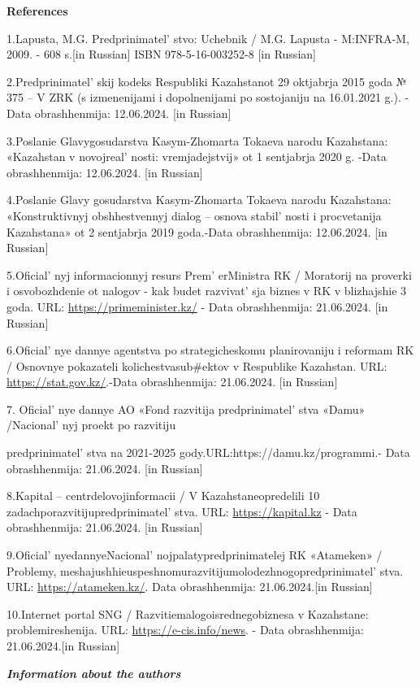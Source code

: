 {\bfseries References}

1.Lapusta, M.G. Predprinimatel' stvo: Uchebnik / M.G.
Lapusta - M:INFRA-M, 2009. - 608 s.{[}in Russian{]} ISBN
978-5-16-003252-8 {[}in Russian{]}

2.Predprinimatel' skij kodeks Respubliki Kazahstanot 29
oktjabrja 2015 goda № 375 -- V ZRK (s izmenenijami i dopolnenijami po
sostojaniju na 16.01.2021 g.). -Data obrashhenmija: 12.06.2024. {[}in
Russian{]}

3.Poslanie Glavygosudarstva Kasym-Zhomarta Tokaeva narodu Kazahstana:
«Kazahstan v novojreal' nosti: vremjadejstvij» ot 1
sentjabrja 2020 g. -Data obrashhenmija: 12.06.2024. {[}in Russian{]}

4.Poslanie Glavy gosudarstva Kasym-Zhomarta Tokaeva narodu Kazahstana:
«Konstruktivnyj obshhestvennyj dialog -- osnova
stabil' nosti i procvetanija Kazahstana» ot 2 sentjabrja
2019 goda.-Data obrashhenmija: 12.06.2024. {[}in Russian{]}

5.Oficial' nyj informacionnyj resurs
Prem' erMinistra RK / Moratorij na proverki i
osvobozhdenie ot nalogov - kak budet razvivat' sja biznes
v RK v blizhajshie 3 goda. URL: \url{https://primeminister.kz/} - Data
obrashhenmija: 21.06.2024. {[}in Russian{]}

6.Oficial' nye dannye agentstva po strategicheskomu
planirovaniju i reformam RK / Osnovnye pokazateli kolichestvasub\#ektov
v Respublike Kazahstan. URL: \url{https://stat.gov.kz/}.-Data
obrashhenmija: 21.06.2024. {[}in Russian{]}

7. Oficial' nye dannye AO «Fond razvitija
predprinimatel' stva «Damu» /Nacional' nyj
proekt po razvitiju

predprinimatel' stva na 2021-2025
gody.URL:https://damu.kz/programmi.- Data obrashhenmija: 21.06.2024.
{[}in Russian{]}

8.Kapital -- centrdelovojinformacii / V Kazahstaneopredelili 10
zadachporazvitijupredprinimatel' stva. URL:
\url{https://kapital.kz} - Data obrashhenmija: 21.06.2024. {[}in
Russian{]}

9.Oficial' nyedannyeNacional' nojpalatypredprinimatelej
RK «Atameken» / Problemy,
meshajushhieuspeshnomurazvitijumolodezhnogopredprinimatel' stva.
URL: \url{https://atameken.kz/}. Data obrashhenmija: 21.06.2024.{[}in
Russian{]}

10.Internet portal SNG / Razvitiemalogoisrednegobiznesa v Kazahstane:
problemireshenija. URL: \url{https://e-cis.info/news}. - Data
obrashhenmija: 21.06.2024.{[}in Russian{]}

\emph{{\bfseries Information about the authors}}

